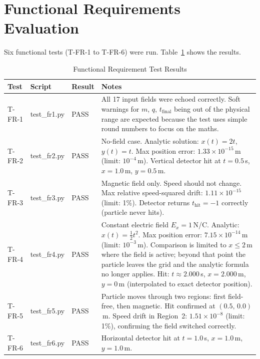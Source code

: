 \documentclass[12pt, titlepage]{article}
\begin{document}
\section{Functional Requirements Evaluation}

Six functional tests (T-FR-1 to T-FR-6) were run.
Table~\ref{tab:fr-results} shows the results.

\begin{table}[h]
\caption{Functional Requirement Test Results}
\label{tab:fr-results}
\centering
\begin{tabular}{lllp{7cm}}
\toprule
\textbf{Test} & \textbf{Script} & \textbf{Result} & \textbf{Notes} \\
\midrule
T-FR-1 & test\_fr1.py & PASS &
  All 17 input fields were echoed correctly.
  Soft warnings for $m$, $q$, $t_\text{final}$ being out of the
  physical range are expected because the test uses simple
  round numbers to focus on the maths. \\
T-FR-2 & test\_fr2.py & PASS &
  No-field case. Analytic solution: $x(t)=2t$, $y(t)=t$.
  Max position error: $1.33\times10^{-15}$\,m (limit: $10^{-4}$\,m).
  Vertical detector hit at $t=0.5$\,s, $x=1.0$\,m, $y=0.5$\,m. \\
T-FR-3 & test\_fr3.py & PASS &
  Magnetic field only. Speed should not change.
  Max relative speed-squared drift: $1.11\times10^{-15}$ (limit: 1\%).
  Detector returns $t_\text{hit}=-1$ correctly (particle never hits). \\
T-FR-4 & test\_fr4.py & PASS &
  Constant electric field $E_x=1$\,N/C. Analytic: $x(t)=\tfrac{1}{2}t^2$.
  Max position error: $7.15\times10^{-14}$\,m (limit: $10^{-3}$\,m).
  Comparison is limited to $x\le2$\,m where the field is active;
  beyond that point the particle leaves the grid and the analytic
  formula no longer applies.
  Hit: $t\approx2.000$\,s, $x=2.000$\,m, $y=0$\,m (interpolated to exact detector position). \\
T-FR-5 & test\_fr5.py & PASS &
  Particle moves through two regions: first field-free, then magnetic.
  Hit confirmed at $(0.5,\,0.0)$\,m.
  Speed drift in Region~2: $1.51\times10^{-8}$ (limit: 1\%),
  confirming the field switched correctly. \\
T-FR-6 & test\_fr6.py & PASS &
  Horizontal detector hit at $t=1.0$\,s, $x=1.0$\,m, $y=1.0$\,m. \\
\bottomrule
\end{tabular}
\end{table}
\end{document}
